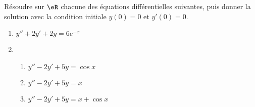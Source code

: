 
\begin{exercice}\label{exoautoanalyseCTU-37}


Résoudre sur $\eR$ chacune des équations différentielles suivantes, puis donner la solution avec la condition initiale $y(0)=0$ et $y'(0)=0$.
\begin{enumerate}
\item  $y''+2y'+2y=6e^{-x}$
\item \begin{enumerate}
\item $y''-2y'+5y=\cos x$
\item $y''-2y'+5y=x$
\item $y''-2y'+5y=x+\cos x$
\end{enumerate}
 \end{enumerate}





\end{exercice}
